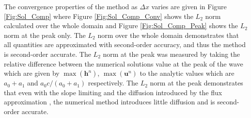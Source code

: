 \documentclass[10pt]{elsarticle}
\newcommand{\vecn}[1]{\boldsymbol{#1}}
\begin{document}
The convergence properties of the method as $\Delta x$ varies are given in Figure \ref{Fig:Sol_Comp}
where Figure \ref{Fig:Sol_Comp_Conv} shows the $L_2$ norm calculated over the whole domain and Figure \ref{Fig:Sol_Comp_Peak} shows the $L_2$ norm at the peak only. The $L_2$ norm over the whole domain demonstrates that all quantities are approximated with second-order accuracy, and thus the method is second-order accurate. The $L_2$ norm at the peak was measured by taking the relative difference between the numerical solutions value at the peak of the wave which are given by $\max\left({\vecn{h}^n}\right)$, $\max\left({\vecn{u}^n}\right)$ to the analytic values which are $a_0 + a_1$ and $ a_0 c / \left(a_0 + a_1\right)$ respectively. The $L_2$ norm at the peak demonstrates that even with the slope limiting and the diffusion introduced by the flux approximation \cite{Pitt-2018-61}, the numerical method introduces little diffusion and is second-order accurate. 
%
\end{document}
